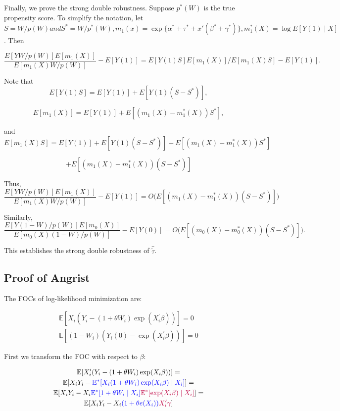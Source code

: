 \documentclass[a4paper,12pt]{article}
\theoremstyle{plain}
\begin{document}
Finally, we prove the strong double robustness. Suppose $p^{*}(W)$ is the true propensity score. To simplify the notation, let $S = W / p(W) and S^{*} = W / p^{*}(W), m_1(x) = \exp\{\alpha^{*} + \tau^{*} + x'(\beta^{*} + \gamma^{*})\}, m_1^{*}(X) = \log E[Y(1) \mid X]$. Then 

$$\frac{E[YW / p(W)]E[m_1(X)]}{E[m_1(X) W / p(W)]} - E[Y(1)] = E[Y(1) S] E[m_1(X)] / E[m_1(X) S] - E[Y(1)].$$

Note that 
$$E[Y(1) S]= E[Y(1)] + E[Y(1) (S - S^{*})],$$

$$E[m_1(X)] = E[Y(1)]  + E[(m_1(X) - m_1^{*}(X))S^{*}],$$


and
$$E[m_1(X) S]= E[Y(1)] + E[Y(1) (S - S^{*})] + E[(m_1(X) - m_1^{*}(X))S^{*}]$$

$$ + E[(m_1(X) - m_1^{*}(X))(S - S^{*})]$$

Thus, 
$$\frac{E[YW / p(W)]E[m_1(X)]}{E[m_1(X) W / p(W)]} - E[Y(1)] = O\bigg(E[(m_1(X) - m_1^{*}(X))(S - S^{*})]\bigg)$$

Similarly,
$$\frac{E[Y(1 - W) / p(W)]E[m_0(X)]}{E[m_0(X) (1 - W) / p(W)]} - E[Y(0)]= O\bigg(E[(m_0(X) - m_0^{*}(X))(S - S^{*})]\bigg).$$

This establishes the strong double robustness of $\hat{\tilde{\tau}}$.

\subsection{Proof of Angrist}

    The FOCs of log-likelihood minimization are:

\begin{gather}
\mathbb{E}[X_i(Y_i - (1 + \theta W_i)\exp(X_i^\prime\beta))] = 0 \\
\mathbb{E}[(1 - W_i)(Y_i(0) - \exp(X_i^\prime\beta))] = 0
\end{gather}

First we transform the FOC with respect to $\beta$:

\begin{gather*}
\mathbb{E}[X_i^\prime(Y_i - (1 + \theta W_i)\exp(X_i\beta))] = \\
\mathbb{E}[X_iY_i - \textcolor{blue}{\mathbb{E}^\ast[X_i(1 + \theta W_i)\exp(X_i\beta) \mid X_i]}] = \\
\mathbb{E}[X_iY_i - X_i\textcolor{blue}{\mathbb{E}^\ast[1 + \theta W_i\mid X_i]}\textcolor{purple}{\mathbb{E}^\ast[\exp(X_i\beta) \mid X_i]}] = \\
\mathbb{E}[X_iY_i - X_i\textcolor{blue}{(1 + \theta e(X_i))}\textcolor{purple}{X_i^\prime\gamma}]
\end{gather*}
\end{document}
